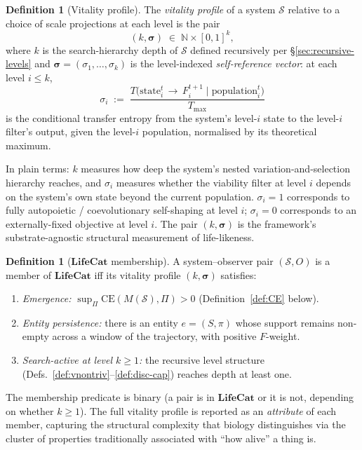 \documentclass[journal]{IEEEtran}
\theoremstyle{plain}
\theoremstyle{definition}
\newtheorem{definition}[theorem]{Definition}
\theoremstyle{plain}
\newcommand{\N}{\mathbb{N}}
\begin{document}
\begin{definition}[Vitality profile]\label{def:vitality}
The \emph{vitality profile} of a system $\mathcal{S}$ relative to a
choice of scale projections at each level is the pair
\[
  (k, \boldsymbol{\sigma}) \;\in\; \N \times [0,1]^k,
\]
where $k$ is the search-hierarchy depth of $\mathcal{S}$ defined
recursively per \S\ref{sec:recursive-levels} and $\boldsymbol{\sigma} =
(\sigma_1, \ldots, \sigma_k)$ is the level-indexed \emph{self-reference
vector}: at each level $i \leq k$,
\[
  \sigma_i \;:=\; \frac{T\!\big(\mathrm{state}_i^t \,\to\, F_i^{t+1} \;\big|\; \mathrm{population}_i^t\big)}{T_{\max}}
\]
is the conditional transfer entropy from the system's level-$i$ state
to the level-$i$ filter's output, given the level-$i$ population,
normalised by its theoretical maximum.
\end{definition}

In plain terms: $k$ measures how deep the system's nested
variation-and-selection hierarchy reaches, and $\sigma_i$ measures
whether the viability filter at level $i$ depends on the system's own
state beyond the current population. $\sigma_i = 1$ corresponds to
fully autopoietic / coevolutionary self-shaping at level $i$;
$\sigma_i = 0$ corresponds to an externally-fixed objective at level
$i$. The pair $(k, \boldsymbol{\sigma})$ is the framework's
substrate-agnostic structural measurement of life-likeness.

\begin{definition}[$\mathbf{LifeCat}$ membership]\label{def:lifecat}
A system--observer pair $(\mathcal{S}, O)$ is a member of
$\mathbf{LifeCat}$ iff its vitality profile $(k, \boldsymbol{\sigma})$
satisfies:
\begin{enumerate}[leftmargin=2em,itemsep=2pt]
  \item \emph{Emergence:} $\sup_\Pi \mathrm{CE}(M(\mathcal{S}), \Pi) > 0$
    (Definition~\ref{def:CE} below).
  \item \emph{Entity persistence:} there is an entity
    $e = (S, \pi)$ whose support remains non-empty across a window of
    the trajectory, with positive $F$-weight.
  \item \emph{Search-active at level $k \geq 1$:} the recursive level
    structure (Defs.~\ref{def:vnontriv}--\ref{def:disc-cap}) reaches
    depth at least one.
\end{enumerate}
\end{definition}

The membership predicate is binary (a pair is in $\mathbf{LifeCat}$
or it is not, depending on whether $k \geq 1$). The full vitality
profile is reported as an \emph{attribute} of each member, capturing
the structural complexity that biology distinguishes via the cluster
of properties traditionally associated with ``how alive'' a thing is.
\end{document}
